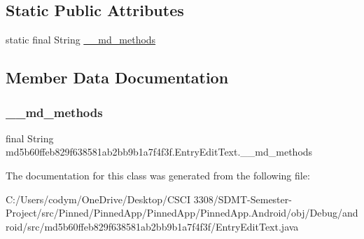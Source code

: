 \subsection*{Static Public Attributes}
\begin{DoxyCompactItemize}
\item 
static final String \hyperlink{classmd5b60ffeb829f638581ab2bb9b1a7f4f3f_1_1_entry_edit_text_a2ad10bc93868a1a331ee5c3f0f6447b6}{\+\_\+\+\_\+md\+\_\+methods}
\end{DoxyCompactItemize}


\subsection{Member Data Documentation}
\mbox{\label{classmd5b60ffeb829f638581ab2bb9b1a7f4f3f_1_1_entry_edit_text_a2ad10bc93868a1a331ee5c3f0f6447b6}} 
\subsubsection{\texorpdfstring{\+\_\+\+\_\+md\+\_\+methods}{\_\_md\_methods}}
{\footnotesize\ttfamily final String md5b60ffeb829f638581ab2bb9b1a7f4f3f.\+Entry\+Edit\+Text.\+\_\+\+\_\+md\+\_\+methods\hspace{0.3cm}{\ttfamily [static]}}



The documentation for this class was generated from the following file\+:\begin{DoxyCompactItemize}
\item 
C\+:/\+Users/codym/\+One\+Drive/\+Desktop/\+C\+S\+C\+I 3308/\+S\+D\+M\+T-\/\+Semester-\/\+Project/src/\+Pinned/\+Pinned\+App/\+Pinned\+App/\+Pinned\+App.\+Android/obj/\+Debug/android/src/md5b60ffeb829f638581ab2bb9b1a7f4f3f/Entry\+Edit\+Text.\+java\end{DoxyCompactItemize}
